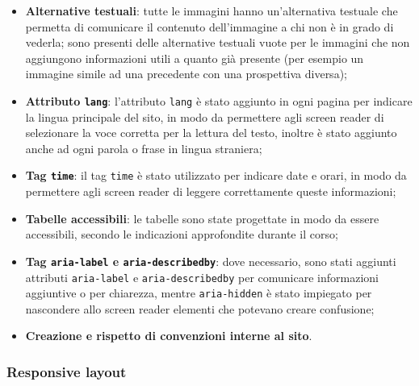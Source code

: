 \begin{itemize}
	\item \textbf{Alternative testuali}: tutte le immagini hanno un'alternativa
	      testuale che permetta di comunicare il contenuto dell'immagine a chi
	      non è in grado di vederla; sono presenti delle alternative testuali vuote
		  per le immagini che non aggiungono informazioni utili a quanto già presente
		  (per esempio un immagine simile ad una precedente con una prospettiva diversa);

	\item \textbf{Attributo \texttt{lang}}: l'attributo \texttt{lang} è stato
	      aggiunto in ogni pagina per indicare la lingua principale del sito,
	      in modo da permettere agli screen reader di selezionare la voce
	      corretta per la lettura del testo, inoltre è stato aggiunto anche
	      ad ogni parola o frase in lingua straniera;

	\item \textbf{Tag \texttt{time}}: il tag \texttt{time} è stato utilizzato
	      per indicare date e orari, in modo da permettere agli screen reader
	      di leggere correttamente queste informazioni;

	\item \textbf{Tabelle accessibili}: le tabelle sono state progettate in modo
	      da essere accessibili, secondo le indicazioni approfondite durante il
	      corso;

	\item \textbf{Tag \texttt{aria-label} e \texttt{aria-describedby}}: dove
	      necessario, sono stati aggiunti attributi \texttt{aria-label} e
	      \texttt{aria-describedby} per comunicare informazioni aggiuntive o 
		  per chiarezza, mentre \texttt{aria-hidden} è stato impiegato per nascondere
		  allo screen reader elementi che potevano creare confusione;

	\item \textbf{Creazione e rispetto di convenzioni interne al sito}.
\end{itemize}

\subsubsection{Responsive layout}

